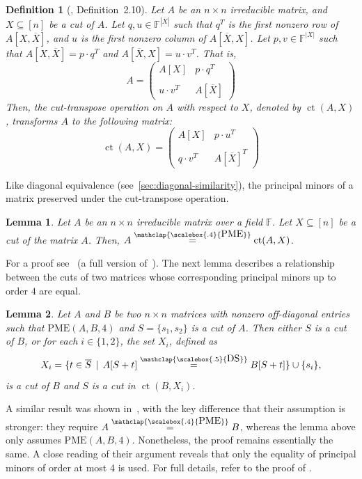 \documentclass[11pt,letterpaper]{article}
\DeclareMathOperator*{\tw}{ct}
\newcommand{\comp}[1]{\overline{#1}}
\newcommand{\F}{\mathbb{F}}
\newtheorem{lemma}{Lemma}[section]
\newtheorem{definition}{Definition}[section]
\newcommand{\DS}{\stackrel{\mathclap{\scalebox{.5}{\mbox{DS}}}}{=}}
\newcommand{\PME}{\stackrel{\mathclap{\scalebox{.4}{\mbox{PME}}}}{=}}
\newcommand{\kPME}[3]{\mathrm{PME}(#1, #2, #3)}
\begin{document}
{{{\begin{definition}[\cite{Chatterjee25}, Definition~2.10]
\label{def:cut-transpose-operation}
Let $A$ be an $n\times n$ irreducible matrix, and $X\subseteq [n]$ be a cut of $A$. Let  $q, u\in\F^{|\comp{X}|}$ such that $q^T$ is the first nonzero row of $A[X,\comp{X}]$, and $u$ is the first nonzero column of $A[\comp{X},X]$. Let $p,v\in\F^{|X|}$  such that $A[X,\comp{X}]=p\cdot q^T$ and $A[\comp{X},X]=u\cdot v^T$. That is,
\[ 
A=\begin{pmatrix}
A[X]        & p\cdot q^T\\
&\\
u\cdot v^T  & A[\comp{X}]
\end{pmatrix}
\] 
Then, the \emph{cut-transpose operation on $A$ with respect to $X$}, denoted by $\tw(A,X)$, transforms $A$ to the following matrix:
\[
\tw(A,X) =
\begin{pmatrix}
A[X]          & p\cdot u^T\\
&\\
q\cdot v^T  & A[\comp{X}]^T
\end{pmatrix}
 \] 
\end{definition}
Like diagonal equivalence (see~\cref{sec:diagonal-similarity}), the principal minors of a matrix preserved under the cut-transpose operation.
\begin{lemma}
\label{lem:PME-under-cut-transpose}
Let $A$ be an $n\times n$ irreducible matrix over a field $\F$. Let $X\subseteq [n]$ be a cut of the matrix $A$. Then, $A\PME \tw(A, X)$.
\end{lemma}
For a proof see~\cite[Appendix~A]{Chatterjee25-full-version} (a full version of~\cite{Chatterjee25}). The next lemma describes a relationship between the cuts of two matrices whose corresponding principal minors up to order $4$ are equal.
\begin{lemma}
\label{lem:Cut-and-PME-upto-4}
Let $A$ and $B$ be two $n\times n$ matrices with nonzero off-diagonal entries such that $\kPME{A}{B}{4}$ and $S=\{s_1, s_2\}$ is a cut of $A$. Then either $S$ is a cut of $B$, or for each $i\in\{1,2\}$, the set $X_i$, defined as $$X_i=\{t\in\comp{S}\,\mid\, A[S+t]\DS B[S+t]\}\cup\{s_i\},$$ is a cut of $B$ and $S$ is a cut in $\tw(B, X_i)$.
\end{lemma}
A similar result was shown in~\cite[Lemma~3.5]{Chatterjee25}, with the key difference that their assumption is stronger: they require $A\PME B$, whereas the lemma above only assumes $\kPME{A}{B}{4}$. Nonetheless, the proof remains essentially the same. A close reading of their argument reveals that only the equality of principal minors of order at most 4 is used. For full details, refer to the proof of \cite[Lemma~3.5]{Chatterjee25}.  

}}}
\end{document}
